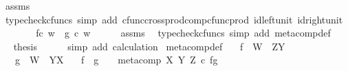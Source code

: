 \begin{isabellebody}
\ assms\ \isamarkupfalse%
\ {\isacharparenleft}{\kern0pt}typecheck{\isacharunderscore}{\kern0pt}cfuncs{\isacharcomma}{\kern0pt}\ simp\ add{\isacharcolon}{\kern0pt}\ cfunc{\isacharunderscore}{\kern0pt}cross{\isacharunderscore}{\kern0pt}prod{\isacharunderscore}{\kern0pt}comp{\isacharunderscore}{\kern0pt}cfunc{\isacharunderscore}{\kern0pt}prod\ id{\isacharunderscore}{\kern0pt}left{\isacharunderscore}{\kern0pt}unit{}\ id{\isacharunderscore}{\kern0pt}right{\isacharunderscore}{\kern0pt}unit{}{\isacharparenright}{\kern0pt}\isanewline
\ \ \isamarkupfalse%
\ \isamarkupfalse%
\ {\isachardoublequoteopen}{\isachardot}{\kern0pt}{\isachardot}{\kern0pt}{\isachardot}{\kern0pt}\ {\isacharequal}{\kern0pt}\ {\isacharparenleft}{\kern0pt}f{\isasymcirc}\isactrlsub c\ w{\isacharparenright}{\kern0pt}\ {\isasymbox}\ {\isacharparenleft}{\kern0pt}g\ {\isasymcirc}\isactrlsub c\ w{\isacharparenright}{\kern0pt}{\isachardoublequoteclose}\isanewline
\ \ \ \ \isamarkupfalse%
\ assms\ \isamarkupfalse%
\ {\isacharparenleft}{\kern0pt}typecheck{\isacharunderscore}{\kern0pt}cfuncs{\isacharcomma}{\kern0pt}\ simp\ add{\isacharcolon}{\kern0pt}\ meta{\isacharunderscore}{\kern0pt}comp{}{\isacharunderscore}{\kern0pt}def{}{\isacharparenright}{\kern0pt}\isanewline
\ \ \isamarkupfalse%
\ \isamarkupfalse%
\ {\isacharquery}{\kern0pt}thesis\isanewline
\ \ \ \ \isamarkupfalse%
\ {\isacharparenleft}{\kern0pt}simp\ add{\isacharcolon}{\kern0pt}\ calculation{\isacharparenright}{\kern0pt}\isanewline
{}\isamarkupfalse%
%
\endisatagproof
{\isafoldproof}%
%
\isadelimproof
\isanewline
%
\endisadelimproof
\isanewline
{}\isamarkupfalse%
\ meta{\isacharunderscore}{\kern0pt}comp{}{\isacharunderscore}{\kern0pt}def{}{\isacharcolon}{\kern0pt}\isanewline
\ \ \ {\isachardoublequoteopen}f\ {\isacharcolon}{\kern0pt}\ W\ {\isasymrightarrow}\ Z\isactrlbsup Y\isactrlesup {\isachardoublequoteclose}\isanewline
\ \ \ {\isachardoublequoteopen}g\ {\isacharcolon}{\kern0pt}\ W\ {\isasymrightarrow}\ Y\isactrlbsup X\isactrlesup {\isachardoublequoteclose}\isanewline
\ \ \ {\isachardoublequoteopen}f\ {\isasymbox}\ g\ \ \ {\isacharequal}{\kern0pt}\ meta{\isacharunderscore}{\kern0pt}comp\ X\ Y\ Z\ {\isasymcirc}\isactrlsub c\ {\isasymlangle}f{\isacharcomma}{\kern0pt}g{\isasymrangle}{\isachardoublequoteclose}\isanewline
%
\isadelimproof
%
\endisadelimproof

\end{isabellebody}
